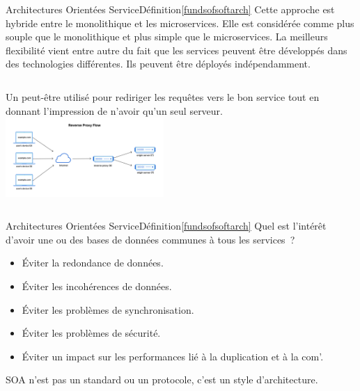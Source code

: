 \documentclass{beamer}
\begin{document}
    \begin{frame}{Architectures Orientées Service}{Définition\cref{fundsofsoftarch}}
        Cette approche est hybride entre le monolithique et les microservices.
        \bigbreak
        Elle est considérée comme plus souple que le monolithique et plus simple que le microservices.
        \bigbreak
        La meilleurs flexibilité vient entre autre du fait que les services peuvent être développés dans des technologies différentes.
        Ils peuvent être déployés indépendamment.
        \bigbreak
        \begin{columns}
            Un  peut-être utilisé pour rediriger les requêtes vers le bon service tout en donnant l'impression de n'avoir qu'un seul serveur.
            \centering
            \includegraphics[width=6cm]{image/reverse-proxy-flow}
        \end{columns}
    \end{frame}

    \begin{frame}{Architectures Orientées Service}{Définition\cref{fundsofsoftarch}}
        Quel est l'intérêt d'avoir une ou des bases de données communes à tous les services~?
        \pause
        \bigbreak
        \begin{itemize}
            \item Éviter la redondance de données.
            \item Éviter les incohérences de données.
            \item Éviter les problèmes de synchronisation.
            \item Éviter les problèmes de sécurité.
            \item Éviter un impact sur les performances lié à la duplication et à la com'.
        \end{itemize}
        \begin{dangercolorbox}
            SOA n'est pas un standard ou un protocole, c'est un style d'architecture.
        \end{dangercolorbox}
    \end{frame}
\end{document}
